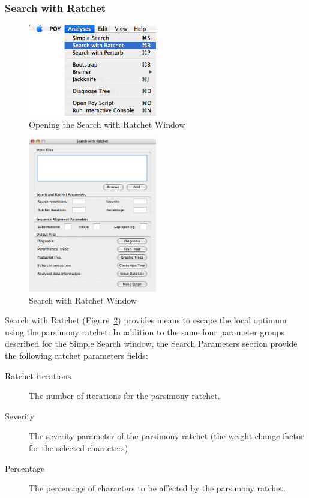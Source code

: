 \subsubsection{Search with Ratchet}

\begin{figure}[htpb]
    \begin{center}
        \includegraphics[width=0.5\textwidth]{figures/SearchWithRatchet_Menu.jpg}
    \end{center}
    \caption{Opening the Search with Ratchet Window}
    \label{fig:search_with_ratchet}
\end{figure}

\begin{figure}[htpb]
    \begin{center}
        \includegraphics[width=0.5\textwidth]{figures/SearchWithRatchet_Window.jpg}
    \end{center}
    \caption{Search with Ratchet Window}
    \label{fig:search_with_ratchet_window}
\end{figure}

Search with Ratchet (Figure~\ref{fig:search_with_ratchet_window}) provides means to escape the local optimum using the
parsimony ratchet.
In addition to the same four
parameter groups described for the Simple Search window, the Search Parameters section provide the
following ratchet parameters fields:
\begin{description}
    \item[Ratchet iterations] The number of iterations for the parsimony
        ratchet.
    \item[Severity] The severity parameter of the parsimony ratchet (the weight
        change factor for the selected characters)
    \item[Percentage] The percentage of characters to be affected by the
        parsimony ratchet.
\end{description}

